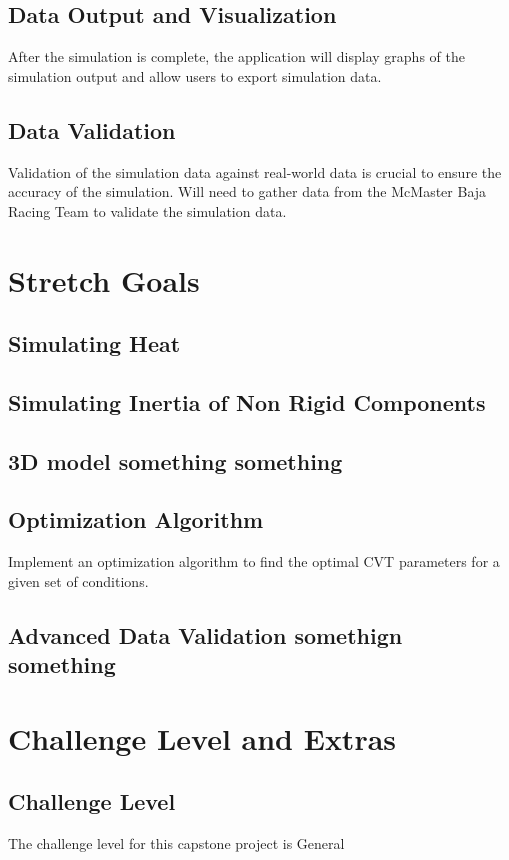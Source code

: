 \documentclass{article}
\begin{document}
\subsection{Data Output and Visualization}
After the simulation is complete, the application will display graphs of the simulation output and allow users to export simulation data.
\subsection{Data Validation}
Validation of the simulation data against real-world data is crucial to ensure the accuracy of the simulation.
Will need to gather data from the McMaster Baja Racing Team to validate the simulation data.

\section{Stretch Goals}
\subsection{Simulating Heat}
\subsection{Simulating Inertia of Non Rigid Components}
\subsection{3D model something something}
\subsection{Optimization Algorithm}
Implement an optimization algorithm to find the optimal CVT parameters for a given set of conditions.
\subsection{Advanced Data Validation somethign something}

\section{Challenge Level and Extras}

\subsection{Challenge Level}

The challenge level for this capstone project is General
\end{document}

